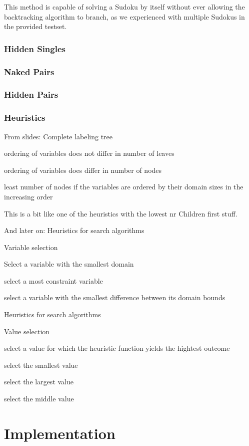 \documentclass[11pt]{article} %
\begin{document}
This method is capable of solving a Sudoku by itself without ever allowing the backtracking algorithm to branch, as we experienced with multiple Sudokus in the provided testset.

\subsubsection{Hidden Singles}



\subsubsection{Naked Pairs}

\subsubsection{Hidden Pairs}

\subsubsection{Heuristics}

From slides:
Complete labeling tree

ordering of variables does not differ in
number of leaves

ordering of variables does differ in number
of nodes

least number of nodes if the variables are
ordered by their domain sizes in the
increasing order

This is a bit like one of the heuristics with the lowest nr Children first stuff.

And later on:
Heuristics for search algorithms

Variable selection

Select a variable with the smallest domain

select a most constraint variable


select a variable with the smallest difference between its domain bounds

Heuristics for search algorithms

Value selection

select a value for which the heuristic function yields the hightest outcome

select the smallest value

select the largest value

select the middle value


\section{Implementation}
\end{document}
